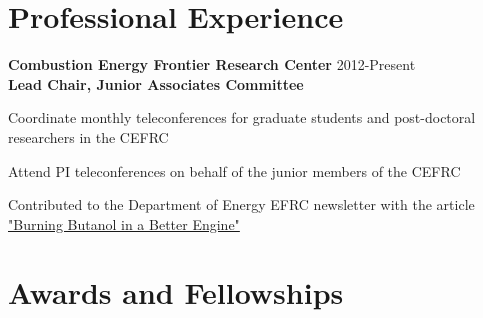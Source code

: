 \section{Professional Experience}
\begin{lonelist}
   \item[] \textbf{Combustion Energy Frontier Research Center} \hfill 
           2012-Present\\
           \textbf{Lead Chair, Junior Associates Committee}
   \begin{innerlist}
      \item Coordinate monthly teleconferences for graduate students
            and post-doctoral researchers in the CEFRC
      \item Attend PI teleconferences on behalf of the junior members
           of the CEFRC
      \item Contributed to the Department of Energy EFRC newsletter
            with the article 
            \href{http://www.energyfrontier.us/newsletter/201210/burning-butanol-better-engine}
            {"Burning Butanol in a Better Engine"}
   \end{innerlist}
\end{lonelist}
 
\vspace{0.5em}

\section{Awards and Fellowships}

